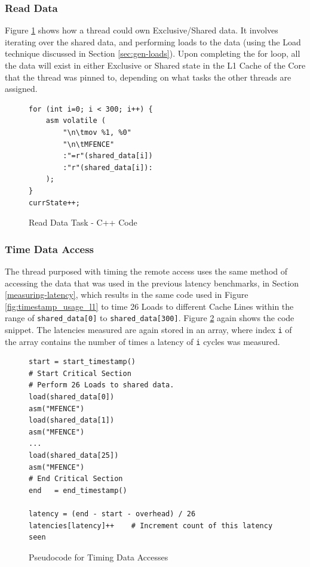 \documentclass[bsc,frontabs,twoside,singlespacing,parskip,deptreport]{infthesis}     %
\begin{document}
\subsubsection{Read Data}
Figure \ref{fig:read-data-task-code} shows how a thread could own Exclusive/Shared data. It involves iterating over the shared data, and performing loads to the data (using the Load technique discussed in Section \ref{sec:gen-loads}). Upon completing the for loop, all the data will exist in either Exclusive or Shared state in the L1 Cache of the Core that the thread was pinned to, depending on what tasks the other threads are assigned.
\begin{figure}[!h]
    \centering
    \begin{minipage}{0.7\textwidth}
    \begin{verbatim}
for (int i=0; i < 300; i++) {
    asm volatile (
        "\n\tmov %1, %0"
        "\n\tMFENCE"
        :"=r"(shared_data[i])
        :"r"(shared_data[i]):
    );
}
currState++;
    \end{verbatim}
    \end{minipage}
    \caption{Read Data Task - C++ Code}
    \label{fig:read-data-task-code}
\end{figure}

\subsubsection{Time Data Access}\label{coherence-timing-task}
The thread purposed with timing the remote access uses the same method of accessing the data that was used in the previous latency benchmarks,  in Section \ref{measuring-latency}, which results in the same code used in Figure \ref{fig:timestamp_usage_l1} to time 26 Loads to different Cache Lines within the range of \texttt{shared\_data[0]} to \texttt{shared\_data[300]}. Figure \ref{fig:time-access} again shows the code snippet. The latencies measured are again stored in an array, where index \texttt{i} of the array contains the number of times a latency of \texttt{i} cycles was measured.

\begin{figure}[!h]
    \centering
    \begin{verbatim}
start = start_timestamp()
# Start Critical Section
# Perform 26 Loads to shared data.
load(shared_data[0])
asm("MFENCE")
load(shared_data[1])
asm("MFENCE")
...
load(shared_data[25])
asm("MFENCE")
# End Critical Section
end   = end_timestamp()

latency = (end - start - overhead) / 26
latencies[latency]++    # Increment count of this latency seen
    \end{verbatim}
    \caption{Pseudocode for Timing Data Accesses}
    \label{fig:time-access}
\end{figure}
\end{document}
